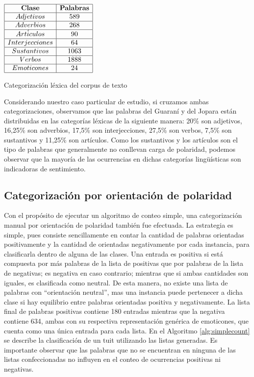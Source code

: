\begin{table}[htb] 
\centering

$
\begin{array}{|c|c|}
      \hline
      \mathbf{Clase}  	& \mathbf{Palabras}	\\
      \hline
      Adjetivos 		& 589				\\
      \hline
      Adverbios 		& 268 				\\
      \hline
      Art\acute{i}culos	& 90				\\
      \hline
      Interjecciones	& 64				\\
      \hline
      Sustantivos		& 1063				\\
      \hline
      Verbos 			& 1888				\\
      \hline
      Emoticones		& 24				\\
      \hline
\end{array}
$
\caption{Categorizaci\'on l\'exica del corpus de texto}
\label{cat_lex}
\end{table}

Considerando nuestro caso particular de estudio, si cruzamos ambas categorizaciones, observamos que las palabras del Guaran\'i y del Jopara est\'an distribuidas en las categor\'ias l\'exicas de la siguiente manera: 20\% son adjetivos, 16,25\%  son adverbios, 17,5\% son interjecciones, 27,5\% son verbos, 7,5\% son sustantivos y 11,25\% son art\'iculos. Como los sustantivos y los art\'iculos son el tipo de palabras que generalmente no conllevan carga de polaridad, podemos observar que la mayor\'ia de las ocurrencias en dichas categor\'ias ling\"u\'isticas son indicadoras de sentimiento.

\subsection{Categorizaci\'on por orientaci\'on de polaridad}

Con el prop\'osito de ejecutar un algoritmo de conteo simple, una categorizaci\'on manual por orientaci\'on de polaridad tambi\'en fue efectuada. La estrategia es simple, pues consiste sencillamente en contar la cantidad de palabras orientadas positivamente y la cantidad de orientadas negativamente por cada instancia, para clasificarla dentro de alguna de las clases. Una entrada es positiva si est\'a compuesta por m\'as palabras de la lista de positivas que por palabras de la lista de negativas; es negativa en caso contrario; mientras que si ambas cantidades son iguales, es clasificada como neutral. De esta manera, no existe una lista de palabras con ``orientaci\'on neutral'', mas una instancia puede pertenecer a dicha clase si hay equilibrio entre palabras orientadas positiva y negativamente. La lista final de palabras positivas contiene 180 entradas mientras que la negativa contiene 634, ambas con su respectiva representaci\'on gen\'erica de emoticones, que cuenta como una \'unica entrada para cada lista. En el Algoritmo \ref{alg:simplecount} se describe la clasificaci\'on de un tuit utilizando las listas generadas. Es importante observar que las palabras que no se encuentran en ninguna de las listas confeccionadas no influyen en el conteo de ocurrencias positivas ni negativas.

